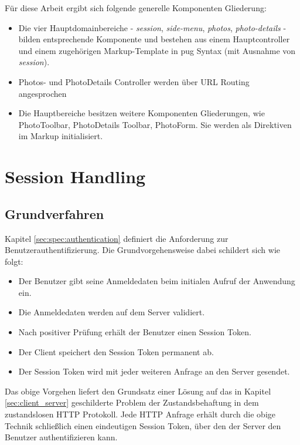 Für diese Arbeit ergibt sich folgende generelle Komponenten Gliederung:

\begin{itemize}
\item Die vier Hauptdomainbereiche - \textit{session}, \textit{side-menu}, \textit{photos}, \textit{photo-details} - bilden entsprechende Komponente und bestehen aus einem Hauptcontroller und einem zugehörigen Markup-Template in \gls{pug} Syntax (mit Ausnahme von \textit{session}).
\item Photos- und PhotoDetails Controller werden über URL Routing angesprochen
\item Die Hauptbereiche besitzen weitere Komponenten Gliederungen, wie PhotoToolbar, PhotoDetails Toolbar, PhotoForm. Sie werden als Direktiven im Markup initialisiert.
\end{itemize}

\section{Session Handling}

\subsection{Grundverfahren}
\label{sec:session_handling_basics}

Kapitel \ref{sec:spec:authentication} definiert die Anforderung zur Benutzerauthentifizierung. Die Grundvorgehensweise dabei schildert sich wie folgt:

\begin{itemize}
  \item Der Benutzer gibt seine Anmeldedaten beim initialen Aufruf der Anwendung ein.
  \item Die Anmeldedaten werden auf dem Server validiert.
  \item Nach positiver Prüfung erhält der Benutzer einen Session Token.
  \item Der Client speichert den Session Token permanent ab.
  \item Der Session Token wird mit jeder weiteren Anfrage an den Server gesendet.
\end{itemize}

Das obige Vorgehen liefert den Grundsatz einer Lösung auf das in Kapitel \ref{sec:client_server} geschilderte Problem der Zustandsbehaftung in dem zustandslosen HTTP Protokoll. Jede HTTP Anfrage erhält durch die obige Technik schließlich einen eindeutigen Session Token, über den der Server den Benutzer authentifizieren kann.

